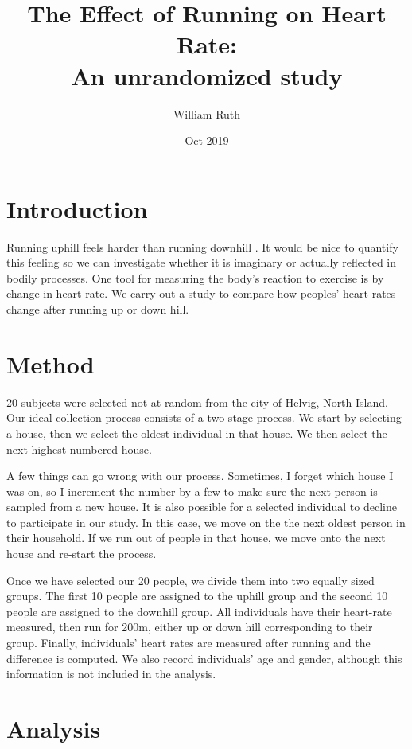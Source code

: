 \documentclass{article}
\title{The Effect of Running on Heart Rate:\\
\large An unrandomized study}
\author{William Ruth}
\date{Oct 2019}
\let\oldcite=\cite
\renewcommand\cite[1]{\ifthenelse{\equal{#1}{NEEDED}}{[citation~needed]}{\oldcite{#1}}}
\begin{document}
\maketitle

\section*{Introduction}

Running uphill feels harder than running downhill \cite{NEEDED}. It would be nice to quantify this feeling so we can investigate whether it is imaginary or actually reflected in bodily processes. One tool for measuring the body's reaction to exercise is by change in heart rate. We carry out a study to compare how peoples' heart rates change after running up or down hill.

\section*{Method}

20 subjects were selected not-at-random from the city of Helvig, North Island. Our ideal collection process consists of a two-stage process. We start by selecting a house, then we select the oldest individual in that house. We then select the next highest numbered house.

A few things can go wrong with our process. Sometimes, I forget which house I was on, so I increment the number by a few to make sure the next person is sampled from a new house. It is also possible for a selected individual to decline to participate in our study. In this case, we move on the the next oldest person in their household. If we run out of people in that house, we move onto the next house and re-start the process.

Once we have selected our 20 people, we divide them into two equally sized groups. The first 10 people are assigned to the uphill group and the second 10 people are assigned to the downhill group. All individuals have their heart-rate measured, then run for 200m, either up or down hill corresponding to their group. Finally, individuals' heart rates are measured after running and the difference is computed. We also record individuals' age and gender, although this information is not included in the analysis.

\newpage

\section*{Analysis}
\end{document}
